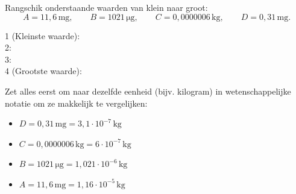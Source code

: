 \documentclass{ximera}
\begin{document}
\begin{exercise}
    Rangschik onderstaande waarden van klein naar groot: 
    \[ A = 11{,}6 \, \mathrm{mg}, \qquad B = 1021 \, \mathrm{\mu g}, \qquad C = 0{,}0000006 \, \mathrm{kg}, \qquad D = 0{,}31 \, \mathrm{mg}. \]
    
    1 (Kleinste waarde):  \\
    2:  \\
    3:  \\
    4 (Grootste waarde): 
    
    \begin{solution}
        Zet alles eerst om naar dezelfde eenheid (bijv. kilogram) in wetenschappelijke notatie om ze makkelijk te vergelijken:
        \begin{itemize}
        \item $D = 0{,}31 \, \mathrm{mg} = 3{,}1 \cdot 10^{-7} \, \mathrm{kg}$
        \item $C = 0{,}0000006 \, \mathrm{kg} = 6 \cdot 10^{-7} \, \mathrm{kg}$
        \item $B = 1021 \, \mathrm{\mu g} = 1{,}021 \cdot 10^{-6} \, \mathrm{kg}$
        \item $A = 11{,}6 \, \mathrm{mg} = 1{,}16 \cdot 10^{-5} \, \mathrm{kg}$
        \end{itemize}
    \end{solution}
\end{exercise}
\end{document}
